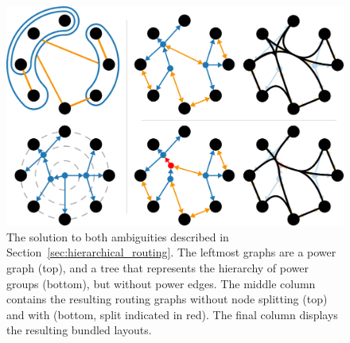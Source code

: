 \begin{figure}
  \centering
  \includegraphics[width=.8\linewidth]{power/solution.pdf}
  \caption[A fixed method for confluent drawing]{The solution to both ambiguities described in Section~\ref{sec:hierarchical_routing}.
  The leftmost graphs are a power graph (top), and a tree that represents the hierarchy of power groups (bottom), but without power edges.
  The middle column contains the resulting routing graphs without node splitting (top) and with (bottom, split indicated in red).
  The final column displays the resulting bundled layouts.
  }
  \label{fig:radial}
\end{figure}

